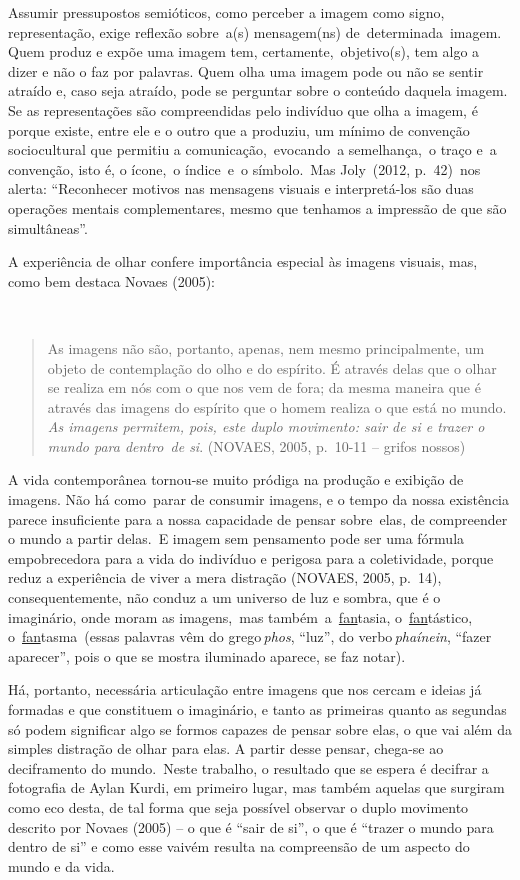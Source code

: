 \documentclass[
  letterpaper,
]{abntex2}
\begin{document}
Assumir pressupostos semióticos, como perceber a imagem como signo,
representação, exige reflexão sobre~a(s) mensagem(ns)
de~determinada~imagem. Quem produz e expõe uma imagem tem,
certamente,~objetivo(s), tem algo a dizer e não o faz por palavras. Quem
olha uma imagem pode ou não se sentir atraído e, caso seja atraído, pode
se perguntar sobre o conteúdo daquela imagem. Se as representações são
compreendidas pelo indivíduo que olha a imagem, é porque existe, entre
ele e o outro que a produziu, um mínimo de convenção sociocultural que
permitiu a comunicação,~evocando~a semelhança,~o traço e~a convenção,
isto é, o ícone,~o índice~e~o símbolo.~Mas Joly~(2012, p.~42)~nos
alerta: ``Reconhecer motivos nas mensagens visuais e interpretá-los são
duas operações mentais complementares, mesmo que tenhamos a impressão de
que são simultâneas''.~

A experiência de olhar confere importância especial às imagens visuais,
mas, como bem destaca Novaes (2005):~

~

\begin{quote}
As imagens não são, portanto, apenas, nem mesmo principalmente, um
objeto de contemplação do olho e do espírito. É através delas que o
olhar se realiza em nós com o que nos vem de fora; da mesma maneira que
é através das imagens do espírito que o homem realiza o que está no
mundo. \emph{As imagens permitem, pois, este duplo movimento: sair de si
e trazer o mundo para dentro~de si}. (NOVAES, 2005, p.~10-11 -- grifos
nossos)~ ~
\end{quote}

A vida contemporânea tornou-se muito pródiga na produção e exibição de
imagens. Não há como~parar de consumir imagens, e o tempo da nossa
existência parece insuficiente para a nossa capacidade de pensar
sobre~elas, de compreender o mundo a partir delas.~E imagem sem
pensamento pode ser uma fórmula empobrecedora para a vida do indivíduo e
perigosa para a coletividade, porque reduz a experiência de viver a mera
distração (NOVAES, 2005, p.~14), consequentemente, não conduz a um
universo de luz e sombra, que é o imaginário, onde moram as imagens,~mas
também~a~\uline{fan}tasia, o~\uline{fan}tástico,
o~\uline{fan}tasma~(essas palavras vêm do grego\,\emph{phos}, ``luz'',
do verbo\,\emph{phaínein}, ``fazer aparecer'', pois o que se mostra
iluminado aparece, se faz notar).~

Há, portanto, necessária articulação entre imagens que nos cercam e
ideias já formadas e que constituem o imaginário, e tanto as primeiras
quanto as segundas só podem significar algo se formos capazes de pensar
sobre elas, o que vai além da simples distração de olhar para elas. A
partir desse pensar, chega-se ao deciframento do mundo.~Neste trabalho,
o resultado que se espera é decifrar a fotografia de Aylan Kurdi, em
primeiro lugar, mas também aquelas que surgiram como eco desta, de tal
forma que seja possível observar o duplo movimento descrito por Novaes
(2005) -- o que é ``sair de si'', o que é ``trazer o mundo para dentro
de si'' e como esse vaivém resulta na compreensão de um aspecto do mundo
e da vida.
\end{document}
